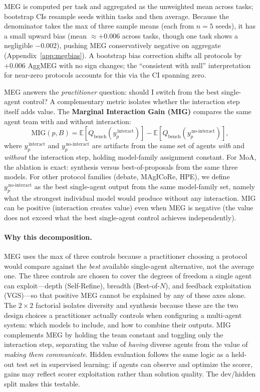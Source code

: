 \documentclass{article}
\newcommand{\mig}{\mathrm{MIG}}
\newcommand{\qbench}{Q_{\text{bench}}}
\begin{document}
MEG is computed per task and aggregated as the unweighted mean across tasks; bootstrap CIs resample seeds within tasks and then average. Because the denominator takes the max of three sample means (each from $n{=}5$ seeds), it has a small upward bias (mean ${\approx}{+}0.006$ across tasks, though one task shows a negligible $-0.002$), pushing MEG conservatively negative on aggregate (Appendix~\ref{app:megbias}). A bootstrap bias correction shifts all protocols by $+0.006$ AggMEG with no sign changes; the ``consistent with null'' interpretation for near-zero protocols accounts for this via the CI spanning zero.

MEG answers the \emph{practitioner} question: should I switch from the best single-agent control? A complementary metric isolates whether the interaction step itself adds value. The \textbf{Marginal Interaction Gain (MIG)} compares the same agent team with and without interaction:
\begin{equation}
\mig(p,B)=\mathbb{E}\!\left[\qbench(y_p^{\,\text{interact}})\right]-
\mathbb{E}\!\left[\qbench(y_p^{\,\text{no-interact}})\right],
\label{eq:mig}
\end{equation}
where $y_p^{\,\text{interact}}$ and $y_p^{\,\text{no-interact}}$ are artifacts from the same set of agents \emph{with} and \emph{without} the interaction step, holding model-family assignment constant. For MoA, the ablation is exact: synthesis versus best-of-proposals from the same three models. For other protocol families (debate, MAgICoRe, HPE), we define $y_p^{\,\text{no-interact}}$ as the best single-agent output from the same model-family set, namely what the strongest individual model would produce without any interaction. MIG can be positive (interaction creates value) even when MEG is negative (the value does not exceed what the best single-agent control achieves independently).

\paragraph{Why this decomposition.}
MEG uses the max of three controls because a practitioner choosing a protocol would compare against the \emph{best} available single-agent alternative, not the average one. The three controls are chosen to cover the degrees of freedom a single agent can exploit---depth (Self-Refine), breadth (Best-of-$N$), and feedback exploitation (VGS)---so that positive MEG cannot be explained by any of these axes alone. The $2{\times}2$ factorial isolates diversity and synthesis because these are the two design choices a practitioner actually controls when configuring a multi-agent system: which models to include, and how to combine their outputs. MIG complements MEG by holding the team constant and toggling only the interaction step, separating the value of \emph{having} diverse agents from the value of \emph{making them communicate}. Hidden evaluation follows the same logic as a held-out test set in supervised learning: if agents can observe and optimize the scorer, gains may reflect scorer exploitation rather than solution quality. The dev/hidden split makes this testable.
\end{document}

